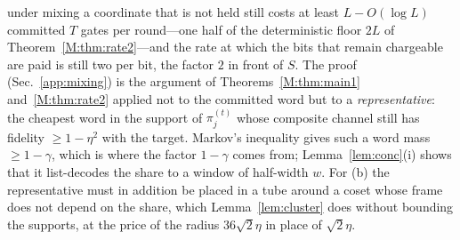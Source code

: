 \documentclass[aps,prx,twocolumn,superscriptaddress,nofootinbib,longbibliography]{revtex4-2}
\theoremstyle{plain}
\theoremstyle{definition}
\theoremstyle{remark}
\begin{document}
under mixing a coordinate that is not held still costs at least $L-O(\log L)$ committed $T$ gates per round---one half of the deterministic floor $2L$ of Theorem~\ref{M:thm:rate2}---and the rate at which the bits that remain chargeable are paid is still two per bit, the factor $2$ in front of $S$. The proof (Sec.~\ref{app:mixing}) is the argument of Theorems~\ref{M:thm:main1} and~\ref{M:thm:rate2} applied not to the committed word but to a \emph{representative}: the cheapest word in the support of $\pi^{(t)}_j$ whose composite channel still has fidelity $\ge1-\eta^2$ with the target. Markov's inequality gives such a word mass $\ge1-\gamma$, which is where the factor $1-\gamma$ comes from; Lemma~\ref{lem:conc}(i) shows that it list-decodes the share to a window of half-width $w$. For (b) the representative must in addition be placed in a tube around a coset whose frame does not depend on the share, which Lemma~\ref{lem:cluster} does without bounding the supports, at the price of the radius $36\sqrt2\eta$ in place of $\sqrt2\eta$.
\end{document}

